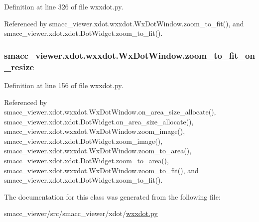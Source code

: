 Definition at line 326 of file wxxdot.\+py.



Referenced by smacc\+\_\+viewer.\+xdot.\+wxxdot.\+Wx\+Dot\+Window.\+zoom\+\_\+to\+\_\+fit(), and smacc\+\_\+viewer.\+xdot.\+xdot.\+Dot\+Widget.\+zoom\+\_\+to\+\_\+fit().

\subsubsection[{\texorpdfstring{zoom\+\_\+to\+\_\+fit\+\_\+on\+\_\+resize}{zoom_to_fit_on_resize}}]{\setlength{\rightskip}{0pt plus 5cm}smacc\+\_\+viewer.\+xdot.\+wxxdot.\+Wx\+Dot\+Window.\+zoom\+\_\+to\+\_\+fit\+\_\+on\+\_\+resize}\hypertarget{classsmacc__viewer_1_1xdot_1_1wxxdot_1_1WxDotWindow_ad624d96f745b20c66119a35fa1d65ae6}{}\label{classsmacc__viewer_1_1xdot_1_1wxxdot_1_1WxDotWindow_ad624d96f745b20c66119a35fa1d65ae6}


Definition at line 156 of file wxxdot.\+py.



Referenced by smacc\+\_\+viewer.\+xdot.\+wxxdot.\+Wx\+Dot\+Window.\+on\+\_\+area\+\_\+size\+\_\+allocate(), smacc\+\_\+viewer.\+xdot.\+xdot.\+Dot\+Widget.\+on\+\_\+area\+\_\+size\+\_\+allocate(), smacc\+\_\+viewer.\+xdot.\+wxxdot.\+Wx\+Dot\+Window.\+zoom\+\_\+image(), smacc\+\_\+viewer.\+xdot.\+xdot.\+Dot\+Widget.\+zoom\+\_\+image(), smacc\+\_\+viewer.\+xdot.\+wxxdot.\+Wx\+Dot\+Window.\+zoom\+\_\+to\+\_\+area(), smacc\+\_\+viewer.\+xdot.\+xdot.\+Dot\+Widget.\+zoom\+\_\+to\+\_\+area(), smacc\+\_\+viewer.\+xdot.\+wxxdot.\+Wx\+Dot\+Window.\+zoom\+\_\+to\+\_\+fit(), and smacc\+\_\+viewer.\+xdot.\+xdot.\+Dot\+Widget.\+zoom\+\_\+to\+\_\+fit().



The documentation for this class was generated from the following file\+:\begin{DoxyCompactItemize}
\item 
smacc\+\_\+viewer/src/smacc\+\_\+viewer/xdot/\hyperlink{wxxdot_8py}{wxxdot.\+py}\end{DoxyCompactItemize}
